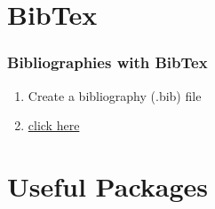 \documentclass{beamer}
\begin{document}
\section{BibTex}
\begin{frame} \frametitle{Bibliographies with BibTex}
  \begin{enumerate}
    \item Create a bibliography (.bib) file\\
     
    \item \href{run:Examples/10-bibtex.bib}{click here}
  \end{enumerate}

\end{frame}

\section{Useful Packages}
\end{document}
